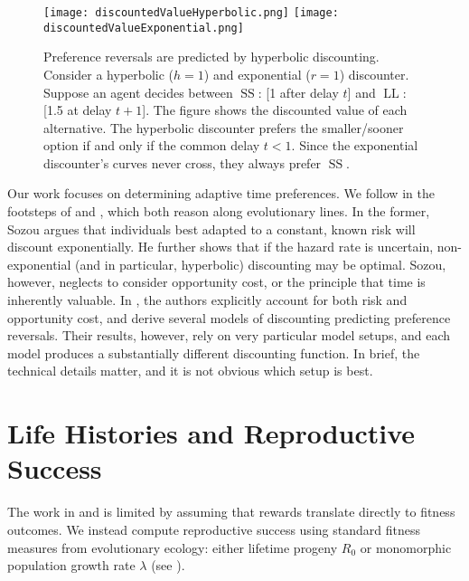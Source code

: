 \documentclass[titlepage, hidelinks, 12pt]{article}
\theoremstyle{plain}
\theoremstyle{remark}
\theoremstyle{definition}
\DeclareMathOperator{\smallersooner}{SS}
\DeclareMathOperator{\largerlater}{LL}
\begin{document}
\begin{figure}[H]
    \centering
    \texttt{[image: discountedValueHyperbolic.png]}
    \texttt{[image: discountedValueExponential.png]}
    \caption[Graphical depiction of a preference reversal.]{Preference reversals are predicted by hyperbolic discounting. Consider a hyperbolic ($h = 1$) and exponential ($r = 1$) discounter. 
       Suppose an agent
    decides between $\smallersooner$: [1 after delay $t$] and $\largerlater$: [1.5 at delay $t+1$]. The figure shows the discounted value
    of each alternative. The hyperbolic discounter prefers the smaller/sooner option if and only if the common delay $t < 1$. 
    Since the exponential discounter's curves never cross, they always prefer $\smallersooner$. }
\end{figure}

Our work focuses on determining adaptive time preferences. 
We follow in the footsteps of \cite{sozou98} and \cite{fawcett12}, which both reason along evolutionary lines. 
In the former, Sozou argues that individuals best adapted
to a constant, known risk will discount exponentially. He further shows that if the hazard rate is uncertain, non-exponential (and in particular,
hyperbolic) discounting may
be optimal. Sozou, however, neglects to consider opportunity cost, or the principle that time is inherently valuable. 
In \cite{fawcett12}, the authors explicitly account for both risk and opportunity cost, and derive several models of discounting predicting 
preference reversals. Their results, however, rely on very particular model setups, and each model produces a substantially different discounting
function. In brief, the technical details matter, and it is not obvious which setup is best.




\section{Life Histories and Reproductive Success}

The work in \cite{sozou98} and \cite{fawcett12} is limited by assuming that rewards translate directly to fitness outcomes. We instead
compute reproductive success
using standard fitness measures from evolutionary ecology: either lifetime progeny $R_0$ or monomorphic population growth rate $\lambda$ 
(see \cite{stearns92}).
\end{document}
